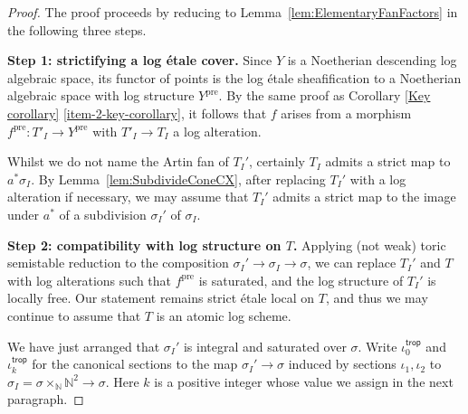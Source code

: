 \documentclass[11pt]{amsart}
\newcommand{\MScomment}[1]{\textcolor{OliveGreen}{[MS: #1]}}
\theoremstyle{definition}
\theoremstyle{definition}
\begin{document}
\begin{proof}
The proof proceeds by reducing to Lemma~\ref{lem:ElementaryFanFactors} in the following three steps. 

\medskip
\noindent\textbf{Step 1: strictifying a log \'etale cover.}
Since $Y$ is a Noetherian descending log algebraic space, its functor of points is the log \'etale sheafification to a Noetherian algebraic space with log structure $Y^\text{pre}$. By the same proof as Corollary \ref{Key corollary} \eqref{item-2-key-corollary}, it follows that $f$ arises from a morphism $f^{\text{pre}}\colon T'_I\rightarrow Y^{\text{pre}}$ with $T'_I\rightarrow T_I$ a log alteration.

Whilst we do not name the Artin fan of $T_I'$, certainly $T_I$ admits a strict map to $a^\ast \sigma_I$. By Lemma~\ref{lem:SubdivideConeCX}, after replacing $T_I'$ with a log alteration if necessary, we may assume that $T_I'$ admits a strict map to the image under $a^\ast$ of a subdivision $\sigma_I'$ of $\sigma_I$.

\medskip
\noindent\textbf{Step 2: compatibility with log structure on $T$.} Applying (not weak) toric semistable reduction \cite{AbramovichKaru,SemistabRedChar0,molcho2019universal} to the composition $\sigma_I'\rightarrow \sigma_I \rightarrow \sigma$, we can replace $T_I'$ and $T$ with log alterations such that $f^\text{pre}$ is saturated, and the log structure of $T_I'$ is locally free.
Our statement remains strict \'etale local on $T$, and thus we may continue to assume that $T$ is an atomic log scheme.

We have just arranged that $\sigma_I'$ is integral and saturated over $\sigma$. 
Write $\iota_0^\mathsf{trop}$ and $\iota_k^\mathsf{trop}$ for the canonical sections to the map $\sigma_I'\longrightarrow \sigma$ induced by sections $\iota_1,\iota_2$ to  
$\sigma_I = \sigma\times_\mathbb{N}\mathbb{N}^2\longrightarrow \sigma.$ Here $k$ is a positive integer whose value we assign in the next paragraph.


\end{proof}
\end{document}
